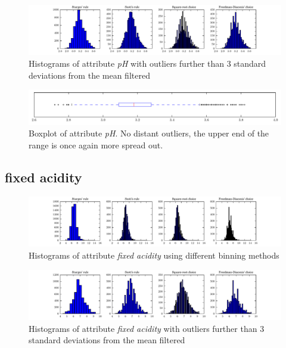 \documentclass{report}
\begin{document}
\begin{figure}[H]
\includegraphics[width=\textwidth]{histograms/pH_filtered.pdf}
\caption{Histograms of attribute \emph{pH} with outliers further than 3 standard deviations from the mean filtered}
\end{figure}

\begin{figure}[H]
\includegraphics[width=\textwidth]{boxplots/pH.pdf}
\caption{Boxplot of attribute \emph{pH}. No distant outliers, the upper end of the range is once again more spread out.}\end{figure}

\newpage
\subsection{fixed acidity}
\begin{figure}[H]
\includegraphics[width=\textwidth]{histograms/fixed_acidity.pdf}
\caption{Histograms of attribute \emph{fixed acidity} using different binning methods}\end{figure}

\begin{figure}[H]
\includegraphics[width=\textwidth]{histograms/fixed_acidity_filtered.pdf}
\caption{Histograms of attribute \emph{fixed acidity} with outliers further than 3 standard deviations from the mean filtered}
\end{figure}
\end{document}
